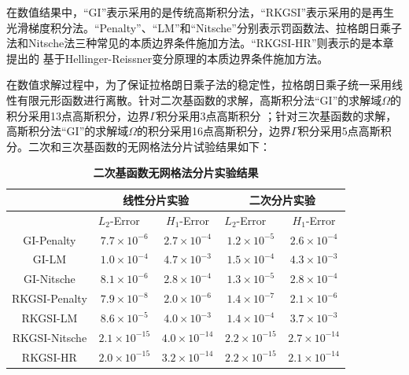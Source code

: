 在数值结果中，“GI”表示采用的是传统高斯积分法，“RKGSI”表示采用的是再生光滑梯度积分法。“Penalty”、“LM”和“Nitsche”分别表示罚函数法、拉格朗日乘子法和Nitsche法三种常见的本质边界条件施加方法。“RKGSI-HR”则表示的是本章提出的
基于Hellinger-Reissner变分原理的本质边界条件施加方法。\par
在数值求解过程中，为了保证拉格朗日乘子法的稳定性，拉格朗日乘子统一采用线性有限元形函数进行离散。针对二次基函数的求解，高斯积分法“GI”的求解域$\Omega$的积分采用13点高斯积分，边界$\Gamma$积分采用3点高斯积分
；针对三次基函数的求解，高斯积分法“GI”的求解域$\Omega$的积分采用16点高斯积分，边界$\Gamma$积分采用5点高斯积分。二次和三次基函数的无网格法分片试验结果如下：\par
\begin{table}[H]
\caption{\textbf{二次基函数无网格法分片实验结果}}
\centering
\begin{tabular}{ccccc}
   \toprule
   $\quad$&\multicolumn{2}{c}{线性分片实验}&\multicolumn{2}{c}{二次分片实验}\\
   \midrule
   &$L_2$-Error$\quad$&$H_1$-Error&$L_2$-Error$\quad$&$H_1$-Error\\
   \midrule
   GI-Penalty&$7.7\times10^{-6}$&$2.7\times10^{-4}$&$1.2\times10^{-5}$&$2.6\times10^{-4}$\\
   GI-LM&$1.0\times10^{-4}$&$4.7\times10^{-3}$&$1.5\times10^{-4}$&$4.3\times10^{-3}$\\
   GI-Nitsche&$8.1\times10^{-6}$&$2.8\times10^{-4}$&$1.3\times10^{-5}$&$2.8\times10^{-4}$\\
  RKGSI-Penalty&$7.9\times10^{-8}$&$2.0\times10^{-6}$&$1.4\times10^{-7}$&$2.1\times10^{-6}$\\
  RKGSI-LM&$8.6\times10^{-5}$&$4.0\times10^{-3}$&$1.4\times10^{-4}$&$3.7\times10^{-3}$\\
  RKGSI-Nitsche&$2.1\times10^{-15}$&$4.0\times10^{-14}$&$2.2\times10^{-15}$&$2.7\times10^{-14}$\\
  RKGSI-HR&$2.0\times10^{-15}$&$3.2\times10^{-14}$&$2.2\times10^{-15}$&$2.1\times10^{-14}$\\
\bottomrule
\end{tabular}
\end{table}
\newpage
